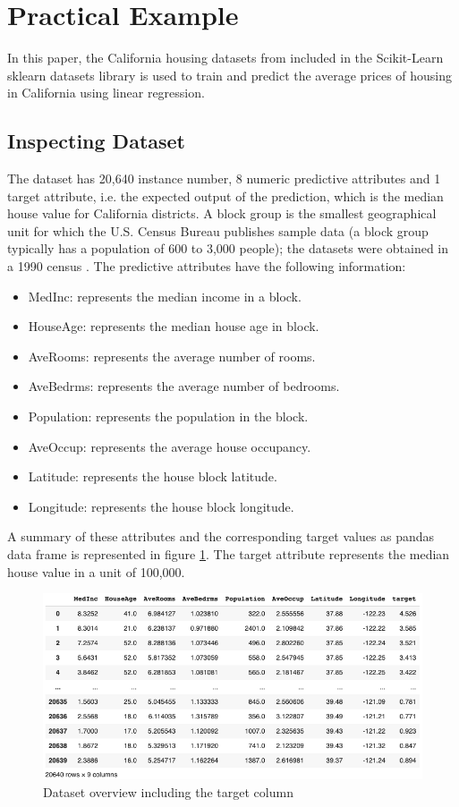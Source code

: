 \documentclass[conference]{IEEEtran}
\begin{document}
\section{Practical Example}
In this paper, the California housing datasets from \cite{KELLEYPACE1997291} included in the Scikit-Learn sklearn datasets library is used to train and predict the average prices of housing in California using linear regression. 
\subsection{Inspecting Dataset}
The dataset has 20,640 instance number, 8 numeric predictive attributes and 1 target attribute, i.e. the expected output of the prediction, which is the median house value for California districts. A block group is the smallest geographical unit for which the U.S. Census Bureau publishes sample data (a block group typically has a population of 600 to 3,000 people); the datasets were obtained in a 1990 census \cite{KELLEYPACE1997291}.
The predictive attributes have the following information: 
	\begin{itemize}
		\item MedInc: represents the median income in a block.
		\item HouseAge: represents the median house age in block.
    		\item AveRooms: represents the average number of rooms.
    		\item AveBedrms: represents the average number of bedrooms.
    		\item Population: represents the population in the block.
    		\item AveOccup: represents the average house occupancy.
	    \item Latitude: represents the house block latitude.
    		\item Longitude: represents the house block longitude.
	\end{itemize}
A summary of these attributes and the corresponding target values as pandas data frame is represented in figure \ref{fig:overview_dataset_with_target}. The target attribute represents the median house value in a unit of 100,000.

\begin{figure}[htbp]
	\centerline{\includegraphics [scale=0.32]{figures/overview_dataset_with_target.png}}
	\caption{Dataset overview including the target column}
	\label{fig:overview_dataset_with_target}
\end{figure}
\end{document}
